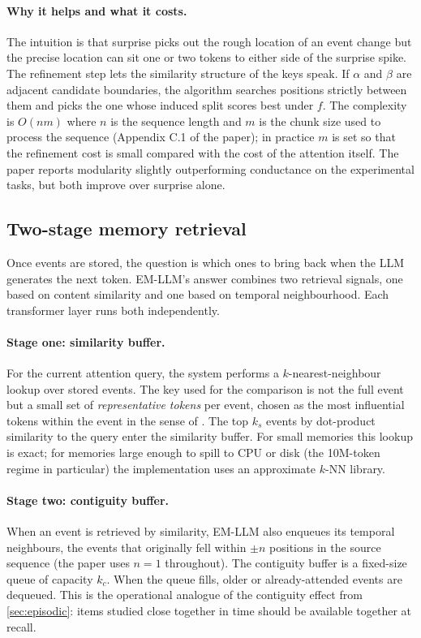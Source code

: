 \paragraph{Why it helps and what it costs.}
The intuition is that surprise picks out the rough location of an event change but the precise location can sit one or two tokens to either side of the surprise spike. The refinement step lets the similarity structure of the keys speak. If $\alpha$ and $\beta$ are adjacent candidate boundaries, the algorithm searches positions strictly between them and picks the one whose induced split scores best under $f$. The complexity is $O(nm)$ where $n$ is the sequence length and $m$ is the chunk size used to process the sequence (Appendix C.1 of the paper); in practice $m$ is set so that the refinement cost is small compared with the cost of the attention itself. The paper reports modularity slightly outperforming conductance on the experimental tasks, but both improve over surprise alone.

\subsection{Two-stage memory retrieval}
\label{sec:method-retrieval}

Once events are stored, the question is which ones to bring back when the LLM generates the next token. EM-LLM's answer combines two retrieval signals, one based on content similarity and one based on temporal neighbourhood. Each transformer layer runs both independently.

\paragraph{Stage one: similarity buffer.}
For the current attention query, the system performs a $k$-nearest-neighbour lookup over stored events. The key used for the comparison is not the full event but a small set of \emph{representative tokens} per event, chosen as the most influential tokens within the event in the sense of \textcite{xiao2024infllm}. The top $k_s$ events by dot-product similarity to the query enter the similarity buffer. For small memories this lookup is exact; for memories large enough to spill to CPU or disk (the 10M-token regime in particular) the implementation uses an approximate $k$-NN library.

\paragraph{Stage two: contiguity buffer.}
When an event is retrieved by similarity, EM-LLM also enqueues its temporal neighbours, the events that originally fell within $\pm n$ positions in the source sequence (the paper uses $n = 1$ throughout). The contiguity buffer is a fixed-size queue of capacity $k_c$. When the queue fills, older or already-attended events are dequeued. This is the operational analogue of the contiguity effect from \cref{sec:episodic}: items studied close together in time should be available together at recall.

